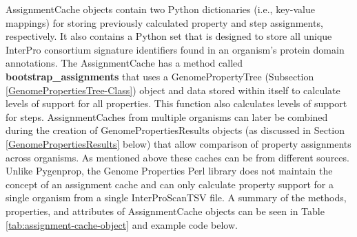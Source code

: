 AssignmentCache objects contain two Python dictionaries (i.e., key-value mappings) for storing previously calculated property and step assignments, respectively. It also contains a Python set that is designed to store all unique InterPro consortium signature identifiers found in an organism's protein domain annotations. The AssignmentCache has a method called \textbf{bootstrap\_assignments} that uses a GenomePropertyTree (Subsection \ref{GenomePropertiesTree-Class}) object and data stored within itself to calculate levels of support for all properties. This function also calculates levels of support for steps. AssignmentCaches from multiple organisms can later be combined during the creation of GenomePropertiesResults objects (as discussed in Section \ref{GenomePropertiesResults} below) that allow comparison of property assignments across organisms. As mentioned above these caches can be from different sources. Unlike Pygenprop, the Genome Properties Perl library does not maintain the concept of an assignment cache and can only calculate property support for a single organism from a single InterProScanTSV file. A summary of the methods, properties, and attributes of AssignmentCache objects can be seen in Table \ref{tab:assignment-cache-object} and example code below.

